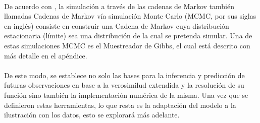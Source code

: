 \\
De acuerdo con \cite{gelman2014bayesian}, la simulaci\'on a trav\'es de las cadenas de Markov tambi\'en llamadas Cadenas de Markov v\'ia simulaci\'on Monte Carlo (MCMC, por sus siglas en ingl\'es) consiste en construir una Cadena de Markov cuya distribuci\'on estacionaria (l\'imite) sea una distribuci\'on de la cual se pretenda simular. Una de estas simulaciones MCMC es el Muestreador de Gibbs, el cual est\'a descrito con m\'as detalle en el ap\'endice.\\
\\
De este modo, se establece no solo las bases para la inferencia y predicci\'on de futuras observaciones en base a la verosimilud extendida y la resoluci\'on de su funci\'on sino tambi\'en la implementaci\'on num\'erica de la misma. Una vez que se definieron estas herramientas, lo que resta es la adaptaci\'on del modelo a la ilustraci\'on con los datos, esto se explorar\'a m\'as adelante.  
